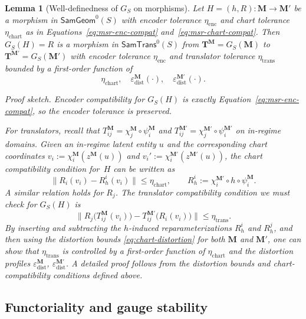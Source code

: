 \documentclass[11pt]{article}
\newtheorem{lemma}{Lemma}
\newcommand{\SamTrans}{\mathsf{SamTrans}}
\newcommand{\SamGeom}{\mathsf{SamGeom}}
\begin{document}
\begin{lemma}[Well-definedness of $G_S$ on morphisms]
\label{lem:G-morphism}
Let $H = (h,R) : \mathbf{M} \to \mathbf{M}'$ be a morphism in
$\SamGeom^0(S)$ with encoder tolerance $\eta_{\mathrm{enc}}$ and chart
tolerance $\eta_{\mathrm{chart}}$ as in Equations~\eqref{eq:msr-enc-compat}
and~\eqref{eq:msr-chart-compat}. Then
$G_S(H) = R$ is a morphism in $\SamTrans^0(S)$ from
$\mathbf{T}^{\mathbf{M}} = G_S(\mathbf{M})$ to
$\mathbf{T}^{\mathbf{M}'} = G_S(\mathbf{M}')$ with encoder tolerance
$\eta_{\mathrm{enc}}$ and translator tolerance
$\eta_{\mathrm{trans}}$ bounded by a first-order function of
\[
\eta_{\mathrm{chart}},\quad
\varepsilon_{\mathrm{dist}}^{\mathbf{M}}(\cdot),\quad
\varepsilon_{\mathrm{dist}}^{\mathbf{M}'}(\cdot).
\]

\emph{Proof sketch.}
Encoder compatibility for $G_S(H)$ is exactly
Equation~\eqref{eq:msr-enc-compat}, so the encoder tolerance is preserved.

For translators, recall that
$T_{ij}^{\mathbf{M}} = \chi_j^{\mathbf{M}}\circ\psi_i^{\mathbf{M}}$ and
$T_{ij}^{\mathbf{M}'} = \chi_j^{\mathbf{M}'}\circ\psi_i^{\mathbf{M}'}$ on
in-regime domains. Given an in-regime latent entity $u$ and the corresponding
chart coordinates $v_i := \chi_i^{\mathbf{M}}(z^{\mathbf{M}}(u))$ and
$v_i' := \chi_i^{\mathbf{M}'}(z^{\mathbf{M}'}(u))$, the chart compatibility
condition for~$H$ can be written as
\[
\bigl\|R_i(v_i) - R_h^i(v_i)\bigr\|
\le \eta_{\mathrm{chart}},
\qquad
R_h^i := \chi_i^{\mathbf{M}'} \circ h \circ \psi_i^{\mathbf{M}}.
\]
A similar relation holds for $R_j$. The translator compatibility condition we
must check for $G_S(H)$ is
\[
\bigl\|
R_j\bigl(T_{ij}^{\mathbf{M}}(v_i)\bigr)
-
T_{ij}^{\mathbf{M}'}\bigl(R_i(v_i)\bigr)
\bigr\|
\le \eta_{\mathrm{trans}}.
\]
By inserting and subtracting the $h$-induced reparameterizations $R_h^i$ and
$R_h^j$, and then using the distortion bounds
\eqref{eq:chart-distortion} for both $\mathbf{M}$ and $\mathbf{M}'$, one can
show that $\eta_{\mathrm{trans}}$ is controlled by a first-order function of
$\eta_{\mathrm{chart}}$ and the distortion profiles
$\varepsilon_{\mathrm{dist}}^{\mathbf{M}}$, $\varepsilon_{\mathrm{dist}}^{\mathbf{M}'}$.
A detailed proof follows from the distortion bounds and chart-compatibility conditions 
defined above. \qedhere
\end{lemma}

\subsection{Functoriality and gauge stability}
\label{subsec:G-functor}
\end{document}
